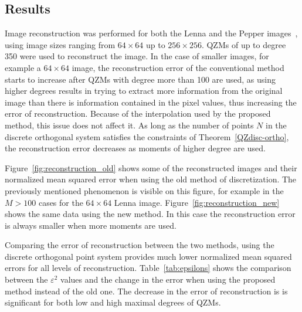 \subsection{Results}
Image reconstruction was performed for both the Lenna and the Pepper images~\cite{usc_sipi}, using image sizes ranging from $64\times 64$ up to $256 \times 256$. QZMs of up to degree 350 were used to reconstruct the image. In the case of smaller images, for example a $64\times 64$ image, the reconstruction error of the conventional method starts to increase after QZMs with degree more than 100 are used, as using higher degrees results in trying to extract more information from the original image than there is information contained in the pixel values, thus increasing the error of reconstruction. Because of the interpolation used by the proposed method, this issue does not affect it. As long as the number of points $N$ in the discrete orthogonal system satisfies the constraints of Theorem~\ref{QZdisc-ortho}, the reconstruction error decreases as moments of higher degree are used.

Figure~\ref{fig:reconstruction_old} shows some of the reconstructed images and their normalized mean squared error when using the old method of discretization. The previously mentioned phenomenon is visible on this figure, for example in the $M > 100$ cases for the $64 \times 64$ Lenna image.
Figure~\ref{fig:reconstruction_new} shows the same data using the new method. In this case the reconstruction error is always smaller when more moments are used.

Comparing the error of reconstruction between the two methods, using the discrete orthogonal point system provides much lower normalized mean squared errors for all levels of reconstruction. 
Table~\ref{tab:epsilons} shows the comparison between the $\varepsilon^2$ values and the change in the error when using the proposed method instead of the old one. The decrease in the error of reconstruction is is significant for both low and high maximal degrees of QZMs. 


